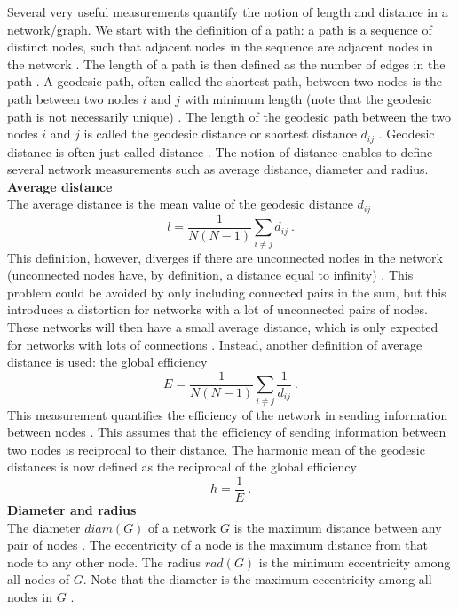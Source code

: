 \documentclass[11 pt , letterpaper , twoside , openright]{book}
\begin{document}
Several very useful measurements quantify the notion of length and distance in a network/graph. We start with the definition of a path: a path is a sequence of distinct nodes, such that adjacent nodes in the sequence are adjacent nodes in the network \cite{Goddard2010}. The length of a path is then defined as the number of edges in the path \cite{Goddard2010}. A geodesic path, often called the shortest path, between two nodes is the path between two nodes $i$ and $j$ with minimum length (note that the geodesic path is not necessarily unique) \cite{F.Costa2007}. The length of the geodesic path between the two nodes $i$ and $j$ is called the geodesic distance or shortest distance $d_{ij}$ \cite{F.Costa2007}. Geodesic distance is often just called distance \cite{Goddard2010}. The notion of distance enables to define several network measurements such as average distance, diameter and radius.\\  
\newline
\textbf{Average distance}\\
\newline
The average distance is the mean value of the geodesic distance $d_{ij}$ \cite{F.Costa2007}
\begin{equation}\label{avdist}
	l = \frac{1}{N(N-1)} \sum_{i \neq j} d_{ij} \ .
\end{equation}
This definition, however, diverges if there are unconnected nodes in the network (unconnected nodes have, by definition, a distance equal to infinity) \cite{F.Costa2007}. This problem could be avoided by only including connected pairs in the sum, but this introduces a distortion for networks with a lot of unconnected pairs of nodes. These networks will then have a small average distance, which is only expected for networks with lots of connections \cite{F.Costa2007}. Instead, another definition of average distance is used: the global efficiency \cite{F.Costa2007}
\begin{equation}
	E = \frac{1}{N(N-1)} \sum_{i \neq j} \frac{1}{d_{ij}} \ .
\end{equation}
This measurement quantifies the efficiency of the network in sending information between nodes \cite{F.Costa2007}. This assumes that the efficiency of sending information between two nodes is reciprocal to their distance. The harmonic mean of the geodesic distances is now defined as the reciprocal of the global efficiency \cite{F.Costa2007}
\begin{equation}
 	h = \frac{1}{E} \ .
\end{equation}
\newline
\textbf{Diameter and radius}\\
\newline
The diameter $diam(G)$ of a network $G$ is the maximum distance between any pair of nodes \cite{Goddard2010}. The eccentricity of a node is the maximum distance from that node to any other node. The radius $rad(G)$ is the minimum eccentricity among all nodes of $G$. Note that the diameter is the maximum eccentricity among all nodes in $G$ \cite{Goddard2010}.
\newpage
\end{document}
